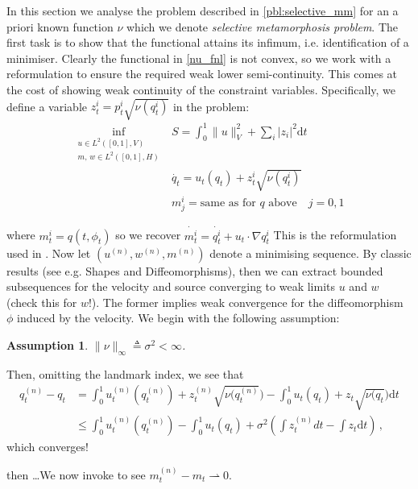 \documentclass{article}
\newtheorem{assumption}{Assumption}
\newcommand{\norm}[2]{\| #1 \|_{ #2 }}
\newcommand{\vnorm}[1]{\norm{ #1 }{V}}
\newcommand{\diff}[1]{\text{d} #1}
\begin{document}
In this section we analyse the problem described in \eqref{pbl:selective_mm} for
an a priori known function $\nu$ which we denote \emph{selective metamorphosis
problem}. The first task is to show that the functional attains its infimum,
i.e. identification of a minimiser. Clearly the functional in \eqref{nu_fnl} is
not convex, so we work with a reformulation to ensure the required weak lower
semi-continuity. This comes at the cost of showing weak continuity of the
constraint variables. Specifically, we define a variable $z^i_t = p^i_t
\sqrt{\nu(q_t^i)}$ in the problem:
\begin{subequations}
\begin{align}
\inf_{\substack{u\in L^2([0,1],V)\\m,\, w \in L^2([0,1],H)}} & S =
\int_0^1\vnorm{u}^2 + \sum_i |z_i|^2 \diff{t}\\
    & \dot{q_t} = u_t ( q_t) + z^i_t \sqrt{\nu(q_t^i)}\\
    & m^i_j = \text{same as for $q$ above}\quad j=0,1
\end{align}
\end{subequations}

where $m^i_t = q(t, \phi_t)$ so we recover $\dot{m^i_t} = \dot{q^i_t} + u_t
\cdot \nabla q^i_t$ This is the reformulation used in \cite[Theorem
1]{richardson2016metamorphosis}. Now let $(u^{(n)}, w^{(n)}, m^{(n)})$ denote a
minimising sequence. By classic results (see e.g.  Shapes and Diffeomorphisms),
then we can extract bounded subsequences for the velocity and source converging
to weak limits $u$ and $w$ (check this for $w$!). The former implies weak
convergence for the diffeomorphism $\phi$ induced by the velocity. We begin with
the following assumption:
\begin{assumption}
$\|\nu\|_\infty \triangleq \sigma^2 <\infty$.
\end{assumption}

Then, omitting the landmark index, we see that\\
\begin{align*}
q_t^{(n)} - q_t & = 
\int_0^1u_t^{(n)}(q_t^{(n)})+z_t^{(n)}\sqrt{\nu(q_t^{(n)}}) 
-\int_0^1u_t(q_t)+z_t\sqrt{\nu(q_t})  \diff{t}\\
&\leq \int_0^1u_t^{(n)}(q_t^{(n)})
-\int_0^1u_t(q_t)
+\sigma^2\left (\int z_t^{(n)} dt
-\int z_t  \diff{t}\right)\, , 
\end{align*}
which converges! 

then \dots We now invoke \cite[Theorem 1]{richardson2016metamorphosis} to see $m_t^{(n)} -
m_t \rightharpoonup 0$.
\end{document}
